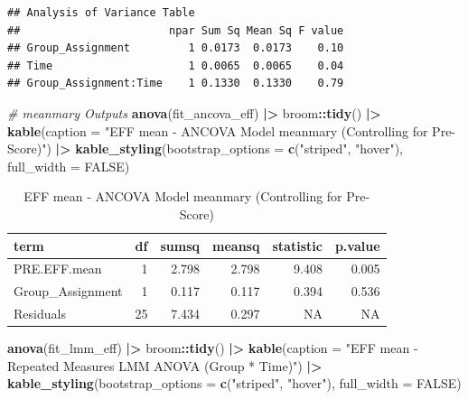 \documentclass[
]{article}
\newenvironment{Shaded}{\begin{snugshade}}{\end{snugshade}}
\newcommand{\AttributeTok}[1]{\textcolor[rgb]{0.13,0.29,0.53}{#1}}
\newcommand{\CommentTok}[1]{\textcolor[rgb]{0.56,0.35,0.01}{\textit{#1}}}
\newcommand{\ConstantTok}[1]{\textcolor[rgb]{0.56,0.35,0.01}{#1}}
\newcommand{\FunctionTok}[1]{\textcolor[rgb]{0.13,0.29,0.53}{\textbf{#1}}}
\newcommand{\NormalTok}[1]{#1}
\newcommand{\SpecialCharTok}[1]{\textcolor[rgb]{0.81,0.36,0.00}{\textbf{#1}}}
\newcommand{\StringTok}[1]{\textcolor[rgb]{0.31,0.60,0.02}{#1}}
\begin{document}
\begin{verbatim}
## Analysis of Variance Table
##                       npar Sum Sq Mean Sq F value
## Group_Assignment         1 0.0173  0.0173    0.10
## Time                     1 0.0065  0.0065    0.04
## Group_Assignment:Time    1 0.1330  0.1330    0.79
\end{verbatim}

\begin{Shaded}
\begin{Highlighting}[]
\CommentTok{\# meanmary Outputs}
\FunctionTok{anova}\NormalTok{(fit\_ancova\_eff) }\SpecialCharTok{|\textgreater{}} 
\NormalTok{  broom}\SpecialCharTok{::}\FunctionTok{tidy}\NormalTok{() }\SpecialCharTok{|\textgreater{}} 
  \FunctionTok{kable}\NormalTok{(}\AttributeTok{caption =} \StringTok{"EFF mean {-} ANCOVA Model meanmary (Controlling for Pre{-}Score)"}\NormalTok{) }\SpecialCharTok{|\textgreater{}} 
  \FunctionTok{kable\_styling}\NormalTok{(}\AttributeTok{bootstrap\_options =} \FunctionTok{c}\NormalTok{(}\StringTok{"striped"}\NormalTok{, }\StringTok{"hover"}\NormalTok{), }\AttributeTok{full\_width =} \ConstantTok{FALSE}\NormalTok{)}
\end{Highlighting}
\end{Shaded}

\begin{longtable}[t]{lrrrrr}
\caption{\label{tab:unnamed-chunk-13}EFF mean - ANCOVA Model meanmary (Controlling for Pre-Score)}\\
\toprule
term & df & sumsq & meansq & statistic & p.value\\
\midrule
PRE.EFF.mean & 1 & 2.798 & 2.798 & 9.408 & 0.005\\
Group\_Assignment & 1 & 0.117 & 0.117 & 0.394 & 0.536\\
Residuals & 25 & 7.434 & 0.297 & NA & NA\\
\bottomrule
\end{longtable}

\begin{Shaded}
\begin{Highlighting}[]
\FunctionTok{anova}\NormalTok{(fit\_lmm\_eff) }\SpecialCharTok{|\textgreater{}} 
\NormalTok{  broom}\SpecialCharTok{::}\FunctionTok{tidy}\NormalTok{() }\SpecialCharTok{|\textgreater{}} 
  \FunctionTok{kable}\NormalTok{(}\AttributeTok{caption =} \StringTok{"EFF mean {-} Repeated Measures LMM ANOVA (Group * Time)"}\NormalTok{) }\SpecialCharTok{|\textgreater{}} 
  \FunctionTok{kable\_styling}\NormalTok{(}\AttributeTok{bootstrap\_options =} \FunctionTok{c}\NormalTok{(}\StringTok{"striped"}\NormalTok{, }\StringTok{"hover"}\NormalTok{), }\AttributeTok{full\_width =} \ConstantTok{FALSE}\NormalTok{)}
\end{Highlighting}
\end{Shaded}
\end{document}
